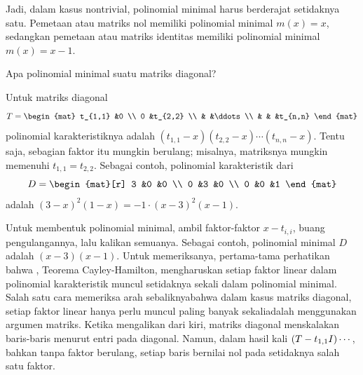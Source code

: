 \begin{exercises}
\begin{answer}
         Jadi, dalam kasus nontrivial, polinomial minimal harus berderajat
         setidaknya satu.
         Pemetaan atau matriks nol memiliki polinomial minimal \( m(x)=x \), sedangkan
         pemetaan atau matriks identitas memiliki polinomial minimal \( m(x)=x-1 \).
       \end{answer}
   \recommended \item 
     Apa polinomial minimal suatu matriks diagonal?
     \begin{answer}
       Untuk matriks diagonal
       \begin{equation*}
          T=
          \begin{mat}
             t_{1,1}   &0        \\
             0         &t_{2,2}  \\
                       &        &\ddots  \\
                       &        &      &t_{n,n}
          \end{mat}
       \end{equation*}
       polinomial karakteristiknya adalah
       $(t_{1,1}-x)(t_{2,2}-x)\cdots (t_{n,n}-x)$.     
       Tentu saja, sebagian faktor itu mungkin berulang; misalnya, matriksnya mungkin
       memenuhi $t_{1,1}=t_{2,2}$.
       Sebagai contoh, polinomial karakteristik dari
       \begin{equation*}
          D=
          \begin{mat}[r]
             3 &0 &0  \\
             0 &3 &0  \\
             0 &0 &1
          \end{mat}
       \end{equation*}
       adalah \( (3-x)^2(1-x)=-1\cdot (x-3)^2(x-1) \).

       Untuk membentuk polinomial minimal,
       ambil faktor-faktor \( x-t_{i,i} \), buang pengulangannya,
       lalu kalikan semuanya.
       Sebagai contoh, polinomial minimal $D$
       adalah \( (x-3)(x-1) \).
       Untuk memeriksanya, pertama-tama perhatikan bahwa ,
       Teorema Cayley-Hamilton, mengharuskan setiap faktor linear dalam
       polinomial karakteristik muncul setidaknya sekali dalam polinomial
       minimal.
       Salah satu cara memeriksa arah sebaliknya\Dash bahwa dalam kasus
       matriks diagonal,
       setiap faktor linear hanya perlu muncul paling banyak sekali\Dash adalah
       menggunakan argumen matriks.
       Ketika mengalikan dari kiri, matriks diagonal menskalakan baris-baris
       menurut entri pada diagonal.
       Namun, dalam hasil kali $(T-t_{1,1}I)\cdots\hbox{}$, bahkan tanpa faktor
       berulang, setiap baris bernilai nol pada setidaknya salah satu faktor.


\end{answer}
\end{exercises}
